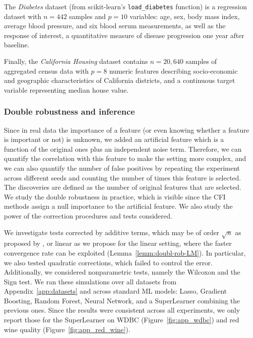 \documentclass{article}
\theoremstyle{plain}
\theoremstyle{definition}
\theoremstyle{remark}
\begin{document}
The \emph{Diabetes} dataset (from scikit-learn’s \citep{scikit-learn} \texttt{load\_diabetes} function) is a regression dataset with $n=442$ samples and $p=10$ variables: age, sex, body mass index, average blood pressure, and six blood serum measurements, as well as the response of interest, a quantitative measure of disease progression one year after baseline.

Finally, the \emph{California Housing} dataset \citep{pace1997} contains $n=20{,}640$ samples of aggregated census data with $p=8$ numeric features describing socio-economic and geographic characteristics of California districts, and a continuous target variable representing median house value. %


\subsubsection{Double robustness and inference}

Since in real data the importance of a feature (or even knowing whether a feature is important or not) is unknown, we added an artificial feature which is a function of the original ones plus an independent noise term. Therefore, we can quantify the correlation with this feature to make the setting more complex, and we can also quantify the number of false positives by repeating the experiment across different seeds and counting the number of times this feature is selected. The discoveries are defined as the number of original features that are selected. We study the double robustness in practice, which is visible since the CFI methods assign a null importance to the artificial feature. We also study the power of the correction procedures and tests considered.

We investigate tests corrected by additive terms, which may be of order $\sqrt{n}$ as proposed by \citet{locoVSShapley}, or linear as we propose for the linear setting, where the faster convergence rate can be exploited (Lemma~\ref{lemm:doubl-rob-LM}). In particular, we also tested quadratic corrections, which failed to control the error. Additionally, we considered nonparametric tests, namely the Wilcoxon and the Sign test. We ran these simulations over all datasets from Appendix~\ref{app:datasets} and across standard ML models: Lasso, Gradient Boosting, Random Forest, Neural Network, and a SuperLearner combining the previous ones. Since the results were consistent across all experiments, we only report those for the SuperLearner on WDBC (Figure~\ref{fig:app_wdbc}) and red wine quality (Figure~\ref{fig:app_red_wine}).
\end{document}
